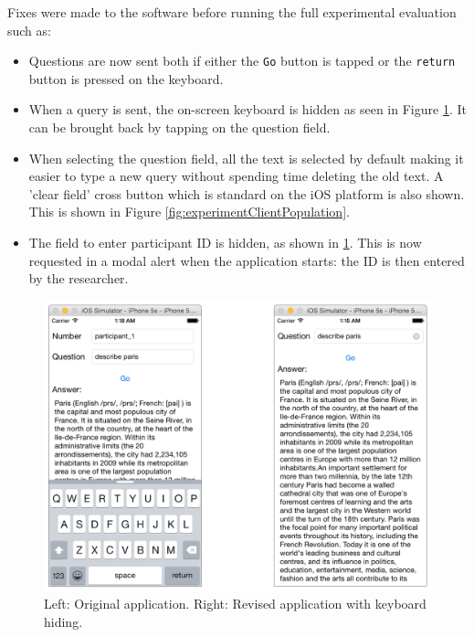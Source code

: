 \documentclass[authoryearcitations]{UoYCSproject}
\begin{document}
Fixes were made to the software before running the full experimental evaluation such as:
\begin{itemize}
  \item Questions are now sent both if either the \texttt{Go} button is tapped or the \texttt{return} button is pressed on the keyboard.
  \item When a query is sent, the on-screen keyboard is hidden as seen in Figure \ref{fig:experimentClientParis}. It can be brought back by tapping on the question field.
  \item When selecting the question field, all the text is selected by default making it easier to type a new query without spending time deleting the old text. A 'clear field' cross button which is standard on the iOS platform is also shown. This is shown in Figure \ref{fig:experimentClientPopulation}.
  \item The field to enter participant ID is hidden, as shown in \ref{fig:experimentClientParis}. This is now requested in a modal alert when the application starts: the ID is then entered by the researcher.
\end{itemize}

\begin{figure}[htb]
    \centering
    \includegraphics[width=\linewidth]{describe_paris}
    \caption{Left: Original application. Right: Revised application with keyboard hiding.}
    \label{fig:experimentClientParis}
\end{figure}
\end{document}
